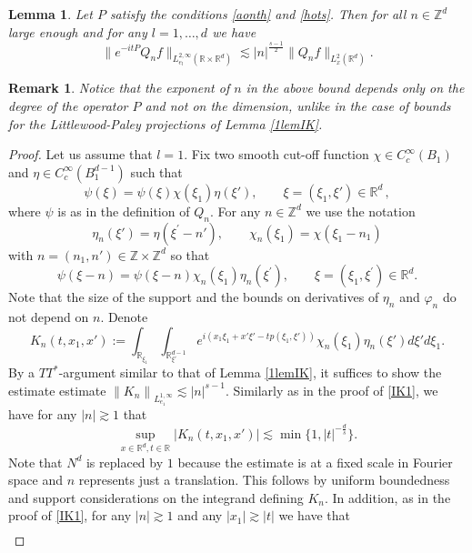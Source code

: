 \documentclass[10pt,leqno]{amsart}
\newtheorem{lem}[thm]{Lemma}
\newtheorem{rmq}[thm]{Remark}
\newcommand{\R}{\mathbb{R}}
\numberwithin{equation}{section}
\newcommand{\Z}{\mathbb{Z}}
\begin{document}
\begin{lem}
\label{lemIO}
Let \(P\) satisfy the conditions \eqref{aonth} and \eqref{hots}. Then for all $n\in \Z^d$ large enough and for any $l=1,\ldots ,d$ we have 
\begin{equation*}
\|e^{-it P } Q_n f\|_{L_{e_l}^{2,\infty} (\R \times \R^d)}\lesssim |n|^{\frac{s-1}{2}} \|Q_n f\|_{L_x^2 (\R^d )}.
\end{equation*}
\end{lem}
\begin{rmq}
Notice that the exponent of \(n\) in the above bound depends only on the degree of the operator \(P\) and not on the dimension, unlike in the case of bounds for the Littlewood-Paley projections of Lemma \ref{1lemIK}.
\end{rmq}

\begin{proof}
Let us assume that \(l=1\). Fix two smooth cut-off function $\chi\in C^{\infty}_{c}(B_{1})$ and $\eta\in C^{\infty}_{c}(B_{1}^{d-1})$ such that 
$$\psi (\xi)= \psi (\xi) \chi (\xi_1) \eta (\xi') ,\qquad \xi= (\xi_1 ,\xi') \in \R^d \,,$$
where $\psi$ is as in the definition of $Q_n$. For any $n \in \Z^d$ we use the notation
\begin{equation*}
\eta_{n} (\xi') = \eta (\xi^\prime - n'),\qquad \chi_n (\xi_1) = \chi(\xi_1 - n_{1})
\end{equation*}
with \(n=(n_{1},n')\in\Z\times\Z^{d}\) so that
$$\psi (\xi -n)= \psi (\xi -n) \chi_n (\xi_1) \eta_n (\xi^\prime) ,\qquad \xi= (\xi_1 ,\xi^\prime) \in \R^d .$$
Note that the size of the support and the bounds on derivatives of $\eta_n$ and $\varphi_n$ do not depend on $n$. Denote 
$$
K_n(t,x_1, x') := \int_{\R_{\xi_1} }  \int_{\R_{\xi'}^{d-1} }e^{i (x_1 \xi_1 +x' \xi'-t p(\xi_1 , \xi')  )} \chi_n (\xi_1) \eta_n (\xi' ) d\xi' d \xi_1.
$$
By a $TT^\ast$-argument similar to that of  Lemma \ref{1lemIK}, it suffices to  show the estimate estimate $\left\|K_n\right\|_{L_{e_{1}}^{1,\infty}}\lesssim|n|^{s-1}$. Similarly as in the proof of \eqref{IK1}, we have for any $|n| \gtrsim 1$ that
$$\sup_{x \in \R^{d} ,t\in \R} |K_n (t,x_1, x')| \lesssim \min \{1, |t|^{-\frac{d}{s}}\}. $$
Note that $N^d$ is replaced by $1$ because the estimate is at a fixed scale in Fourier space and $n$ represents just a translation. This follows by uniform boundedness and support considerations on the integrand defining \(K_{n}\). In addition, as in  the proof of \eqref{IK1}, for any $|n| \gtrsim 1$ and any $|x_1| \gtrsim|t|$ we have that
\begin{align*}

\end{align*}
\end{proof}
\end{document}
